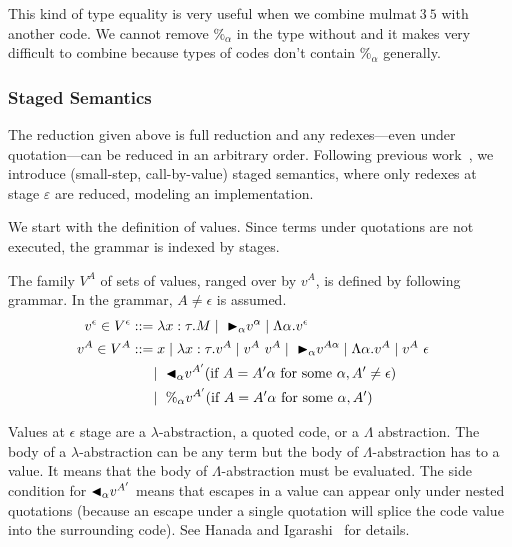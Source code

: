 This kind of type equality is very useful when we combine $\text{mulmat}\ 3\ 5$ with another code.
We cannot remove $\%_\alpha$ in the type without \QPercent and it makes very difficult to combine
because types of codes don't contain $\%_\alpha$ generally.


\subsubsection{Staged Semantics}

The reduction given above is full reduction and any redexes---even
under quotation---can be reduced in an arbitrary order.  Following
previous work~\cite{}, we introduce (small-step, call-by-value) staged
semantics, where only redexes at stage $\varepsilon$ are reduced, modeling an
implementation.

We start with the definition of values.  Since terms under quotations are
not executed, the grammar is indexed by stages.

\begin{definition}[Values]
	The family $V^A$ of sets of values, ranged over by $v^A$,
	is defined by following grammar.  In the grammar, $A \neq \epsilon$ is assumed.
	\begin{align*}
		v^\epsilon \in V^\epsilon & ::= \lambda x:\tau.M \mid\ {\mathop{\blacktriangleright}}_\alpha v^\alpha \mid \Lambda\alpha.v^\epsilon                                       & \\
		v^A \in V^A               & ::= x \mid \lambda x:\tau.v^A \mid v^A\ v^A \mid\ {\mathop{\blacktriangleright}}_\alpha v^{A\alpha} \mid \Lambda\alpha.v^A \mid v^A\ \epsilon & \\
		                         & \quad\   \mid\ {\mathop{\blacktriangleleft}}_\alpha v^{A'} (\text{if } A = A'\alpha \text{ for some } \alpha, A' \neq \epsilon)                          & \\
                                          & \quad\   \mid\ \%_\alpha v^{A'} (\text{if } A = A'\alpha  \text{ for some } \alpha, A')
	\end{align*}
\end{definition}

Values at $\epsilon$ stage are a $\lambda$-abstraction, a quoted code,
or a $\Lambda$ abstraction.  The body of a $\lambda$-abstraction can
be any term but the body of $\Lambda$-abstraction has to a value.  It
means that the body of $\Lambda$-abstraction must be evaluated.  The
side condition for ${\mathop{\blacktriangleleft}}_\alpha v^{A'}$ means that escapes in a value
can appear only under nested quotations (because an escape under a
single quotation will splice the code value into the surrounding
code).  See Hanada and Igarashi~\cite{} for details.

